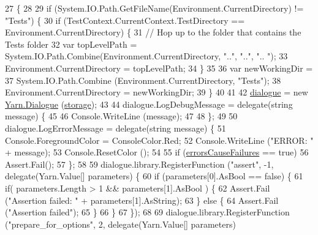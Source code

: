 \begin{DoxyCode}
27         \{
28 
29             \textcolor{keywordflow}{if} (System.IO.Path.GetFileName(Environment.CurrentDirectory) != \textcolor{stringliteral}{"Tests"}) \{
30                 \textcolor{keywordflow}{if} (TestContext.CurrentContext.TestDirectory == Environment.CurrentDirectory) \{
31                     \textcolor{comment}{// Hop up to the folder that contains the Tests folder}
32                     var topLevelPath = System.IO.Path.Combine(Environment.CurrentDirectory, \textcolor{stringliteral}{".."}, \textcolor{stringliteral}{".."}, \textcolor{stringliteral}{"..
      "});
33                     Environment.CurrentDirectory = topLevelPath;
34                 \}
35 
36                 var newWorkingDir = 
37                     System.IO.Path.Combine (Environment.CurrentDirectory, \textcolor{stringliteral}{"Tests"});
38                 Environment.CurrentDirectory = newWorkingDir;
39             \}
40 
41 
42             \hyperlink{a00091_a71e2faf638964bef54b8e4beb440254a}{dialogue} = \textcolor{keyword}{new} \hyperlink{a00050}{Yarn.Dialogue} (\hyperlink{a00091_a79615582ff47da7c2603d52ca0aac07b}{storage});
43 
44             dialogue.LogDebugMessage = delegate(\textcolor{keywordtype}{string} message) \{
45                 
46                 Console.WriteLine (message);
47 
48             \};
49 
50             dialogue.LogErrorMessage = delegate(\textcolor{keywordtype}{string} message) \{
51                 Console.ForegroundColor = ConsoleColor.Red;
52                 Console.WriteLine (\textcolor{stringliteral}{"ERROR: "} + message);
53                 Console.ResetColor ();
54 
55                 \textcolor{keywordflow}{if} (\hyperlink{a00091_a1e0244f4c5261bad66a866fd6ec38f6d}{errorsCauseFailures} == \textcolor{keyword}{true})
56                     Assert.Fail();
57             \};
58 
59             dialogue.library.RegisterFunction (\textcolor{stringliteral}{"assert"}, -1, delegate(Yarn.Value[] parameters) \{
60                 \textcolor{keywordflow}{if} (parameters[0].AsBool == \textcolor{keyword}{false}) \{
61                     \textcolor{keywordflow}{if}( parameters.Length > 1 && parameters[1].AsBool ) \{
62                         Assert.Fail (\textcolor{stringliteral}{"Assertion failed: "} + parameters[1].AsString);
63                     \} \textcolor{keywordflow}{else} \{
64                         Assert.Fail (\textcolor{stringliteral}{"Assertion failed"});
65                     \}
66                 \}
67             \});
68 
69             dialogue.library.RegisterFunction (\textcolor{stringliteral}{"prepare\_for\_options"}, 2, delegate(Yarn.Value[] parameters) 

\end{DoxyCode}

